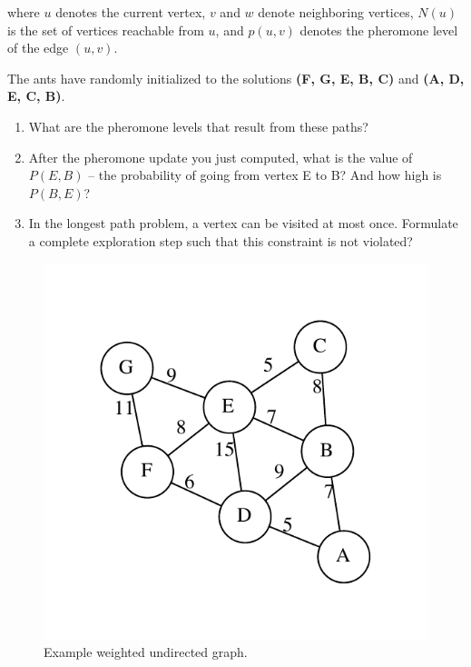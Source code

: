 \documentclass[a4paper]{article}
\begin{document}
\noindent
where $u$ denotes the current vertex, $v$ and $w$ denote neighboring vertices, $N(u)$ is the set of vertices reachable from $u$, and $p(u,v)$ denotes the pheromone level of the edge $(u,v)$.

The ants have randomly initialized to the solutions \textbf{(F, G, E, B, C)} and \textbf{(A, D, E, C, B)}.

\begin{enumerate}

\item
  What are the pheromone levels that result from these paths?

\item
  After the pheromone update you just computed, what is the value of $P(E,B)$ -- the probability of going from vertex E to B?
  And how high is $P(B,E)$?

  
\item
  In the longest path problem, a vertex can be visited at most once.
  Formulate a complete exploration step such that this constraint is not violated?
  
\end{enumerate}

\begin{figure}
  \centering
  \includegraphics[width=0.4\columnwidth,trim=1cm 1cm 1cm 1cm]{fig/mst-exercise-1.pdf}
  \caption{
    Example weighted undirected graph.
  }\label{fig:aco}
\end{figure}
\end{document}
